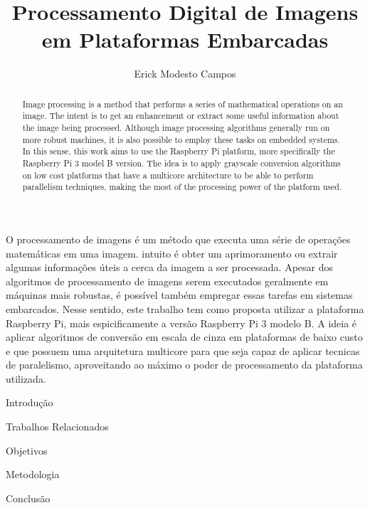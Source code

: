 \documentclass[12pt]{article}
\title{Processamento Digital de Imagens em Plataformas Embarcadas}
\author{Erick Modesto Campos}
\begin{document}
 

\onehalfspace
\maketitle

\begin{abstract}
Image processing is a method that performs a series of mathematical operations
on an image. The intent is to get an enhancement or extract some useful
information about the image being processed. Although image processing
algorithms generally run on more robust machines, it is also possible to employ
these tasks on embedded systems. In this sense, this work aims to use the
Raspberry Pi platform, more specifically the Raspberry Pi 3 model B version. The
idea is to apply grayscale conversion algorithms on low cost platforms that have
a multicore architecture to be able to perform parallelism techniques, making
the most of the processing power of the platform used.
\end{abstract}
     
\begin{resumo} 
O processamento de imagens é um método que executa uma série de operações
matemáticas em uma imagem.  intuito é obter um aprimoramento ou extrair algumas
informações úteis a cerca da imagem a ser processada. Apesar dos algoritmos de
processamento de imagens serem executados geralmente em máquinas mais robustas,
é possível também empregar essas tarefas em sistemas embarcados.  Nesse sentido,
este trabalho tem como proposta utilizar a plataforma Raspberry Pi, mais
espicificamente a versão Raspberry Pi 3 modelo B. A ideia é aplicar algoritmos
de conversão em escala de cinza em plataformas de baixo custo e que possuem uma
arquitetura multicore para que seja capaz de aplicar tecnicas de paralelismo,
aproveitando ao máximo o poder de processamento da plataforma utilizada.
\end{resumo}

\begin{section}{Introdução}

\end{section}
\begin{section}{Trabalhos Relacionados}

\end{section}
\begin{section}{Objetivos}

\end{section}
\begin{section}{Metodologia}

\end{section}
\begin{section}{Conclusão}

\end{section}



\end{document}
